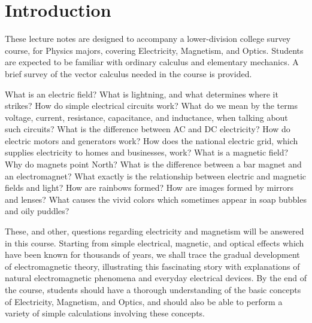 \section{Introduction}
These lecture notes are designed to accompany a lower-division college survey
course, for Physics majors, covering Electricity, Magnetism, and Optics. Students are expected
to be familiar with ordinary calculus and elementary mechanics. A brief survey of
the vector calculus needed in the course is provided.

What is an electric field? What is lightning,  and what determines where it strikes? How do
simple electrical circuits work? What do we mean by the terms voltage, current, resistance, capacitance, and inductance, when talking  about such circuits? What is the difference between AC and DC electricity?
How do electric motors and generators
work? How does the national electric grid, which supplies 
electricity to homes and businesses, work? What is a magnetic field? Why do magnets point North?
What is the difference between a bar magnet and an electromagnet?
What exactly is the relationship
between electric and magnetic fields and light? How are rainbows formed?
How are images formed by mirrors and lenses? What causes the vivid
colors which sometimes appear in soap bubbles and oily puddles?

These, and other, questions regarding electricity and magnetism will be answered in this course. Starting from simple electrical, magnetic, and optical
effects which have been known for thousands of years, we shall trace
the gradual development of electromagnetic theory,  illustrating
this fascinating story with explanations of natural electromagnetic phenomena and everyday electrical
devices. By the end of the course, students should have a thorough 
understanding of the basic concepts of Electricity, Magnetism, and Optics,
and should also be able to perform a variety of simple calculations
involving these concepts.
